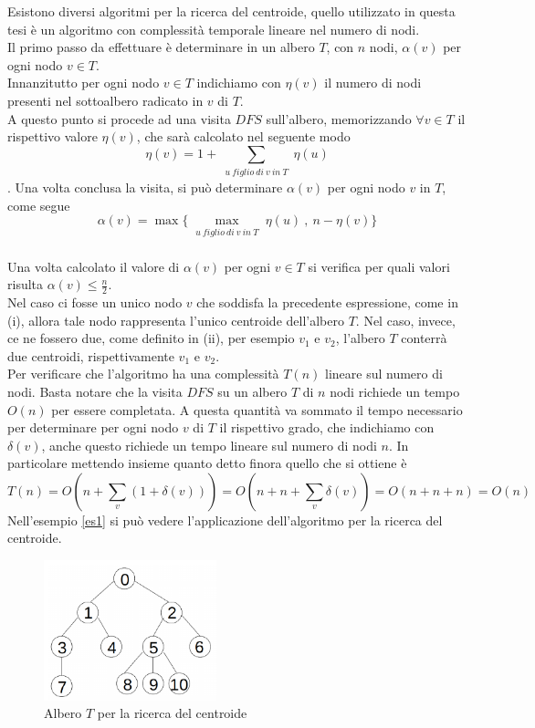 Esistono diversi algoritmi per la ricerca del centroide, quello utilizzato in questa tesi \`e un algoritmo con complessit\`a temporale lineare nel numero di nodi. \\
Il primo passo da effettuare \`e determinare in un albero $ T $, con $ n $ nodi, $\alpha(v)$ per ogni nodo $ v \in T$.\\
Innanzitutto per ogni nodo $ v\in T $ indichiamo con $ \eta(v) $ il numero di nodi presenti nel sottoalbero radicato in $ v $ di $ T $.\\
A questo punto si procede ad una visita $ DFS $ sull'albero, memorizzando $ \forall v\in T $ il rispettivo valore $ \eta(v) $, che sar\`a calcolato nel seguente modo 
\[\eta(v) = 1 + \sum_{\substack{u \ figlio \ di \ v \ in \ T} } { \eta(u)}\].
Una volta conclusa la visita, si pu\`o determinare $ \alpha(v) $ per ogni nodo $ v $ in $ T $, come segue
\[ \alpha(v) = \max\{ \max_{\substack{u \ figlio \ di \ v \ in \ T}} {\eta(u)} \ , \ n - \eta(v) \} \]
\\
Una volta calcolato il valore di $ \alpha(v) $ per ogni $  v \in T $ si verifica per quali valori  risulta $\alpha(v)\le\frac{n}{2}$.\\
Nel caso ci fosse un unico nodo $ v $ che soddisfa la precedente espressione, come in (i),  allora tale nodo rappresenta l'unico  centroide dell'albero $ T $.
Nel caso, invece, ce ne fossero due, come definito in (ii), per esempio $ v_1 $ e $ v_2 $,  l'albero $ T $ conterr\`a due centroidi, rispettivamente $ v_1 $ e $ v_2 $.\\
Per verificare che l'algoritmo ha una complessit\`a $ T(n) $ lineare sul numero di nodi.
Basta notare che la visita $ DFS $ su un albero $ T $ di $ n $ nodi richiede un tempo $ O(n) $ per essere completata.
A questa quantit\`a va sommato il tempo necessario per determinare per ogni nodo $ v $ di $ T $ il rispettivo grado, che indichiamo con $ \delta(v) $, anche questo richiede un tempo lineare sul numero di nodi $ n $.
In particolare mettendo insieme quanto detto finora quello che si ottiene \`e
\[  T(n) = O(n + \sum_{v}(1+\delta(v)))= O(n + n + \sum_{v}\delta(v)) = O(n+n+n)=O(n)\] 
Nell'esempio \ref{es1} si pu\`o vedere l'applicazione dell'algoritmo per la ricerca del centroide.
	\begin{figure}[htbp]
		\centering
		\includegraphics[width=5cm]{capitolo3/grafo2}
		\caption{Albero $ T $  per la ricerca del centroide} 
		\label{fig:2}
\end{figure}
\mbox{}\\

